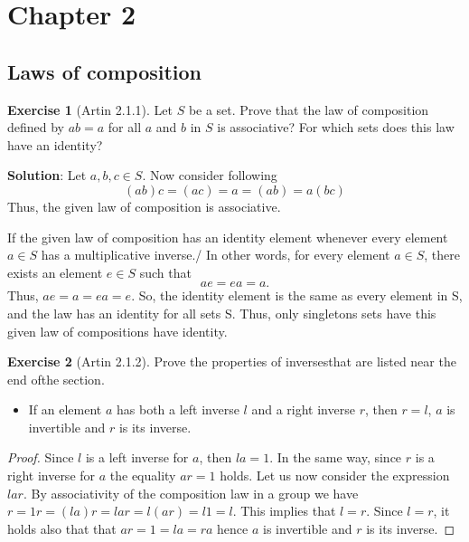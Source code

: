 \documentclass[
]{book}
\providecommand{\tightlist}{%
  \setlength{\itemsep}{0pt}\setlength{\parskip}{0pt}}
\theoremstyle{definition}
\theoremstyle{definition}
\theoremstyle{definition}
\newtheorem{exercise}{Exercise}[chapter]
\theoremstyle{definition}
\theoremstyle{remark}
\begin{document}
\hypertarget{chapter-2}{%
\section{Chapter 2}\label{chapter-2}}

\hypertarget{laws-of-composition}{%
\subsection{Laws of composition}\label{laws-of-composition}}

\begin{exercise}[Artin 2.1.1]
\protect\hypertarget{exr:unnamed-chunk-84}{}\label{exr:unnamed-chunk-84}Let \(S\) be a set. Prove that the law of composition defined by \(ab = a\) for all \(a\) and \(b\) in \(S\) is associative? For which sets does this law have an identity?
\end{exercise}

\textbf{Solution}: Let \(a,b,c\in S\).
Now consider following
\[(ab)c=(ac)=a=(ab)=a(bc)\]
Thus, the given law of composition is associative.

If the given law of composition has an identity element whenever every element \(a\in S\) has a multiplicative inverse./
In other words, for every element \(a\in S\), there exists an element \(e \in S\) such that \[ae = ea = a.\]
Thus, \(ae=a=ea=e\). So, the identity element is the same as every element in S, and the law has an identity for all sets S. Thus, only singletons sets have this given law of compositions have identity.

\begin{exercise}[Artin 2.1.2]
\protect\hypertarget{exr:unnamed-chunk-85}{}\label{exr:unnamed-chunk-85}Prove the properties of inversesthat are listed near the end ofthe section.
\end{exercise}

\begin{itemize}
\tightlist
\item
  If an element \(a\) has both a left inverse \(l\) and a right inverse \(r\), then \(r = l\), \(a\) is invertible and \(r\) is its inverse.
\end{itemize}

\begin{proof}
Since \(l\) is a left inverse for \(a\), then \(la = 1\). In the same way, since \(r\) is a right inverse for \(a\) the equality \(ar = 1\) holds. Let us now consider the expression \(lar\). By associativity of the composition law in a group we have \(r = 1r = (la)r = lar = l(ar) = l1 = l\). This implies that \(l = r\). Since \(l = r\), it holds also that that \(ar = 1 = la = ra\) hence \(a\) is invertible and \(r\) is its inverse.
\end{proof}
\end{document}
